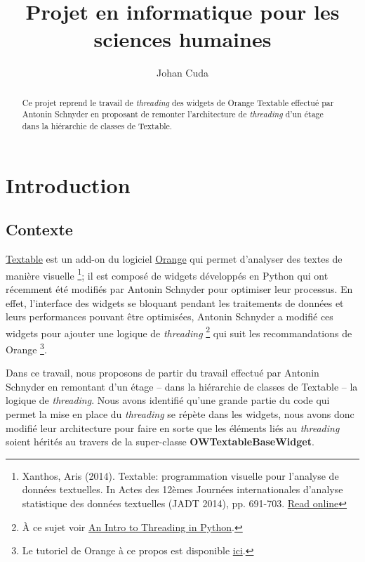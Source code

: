 \documentclass{article}
\title{Projet en informatique pour les sciences humaines}
\author{Johan Cuda}
\begin{document}
\maketitle

\begin{abstract}
Ce projet reprend le travail de \textit{threading} des widgets de Orange Textable effectué par Antonin Schnyder en proposant de remonter l'architecture de \textit{threading} d'un étage dans la hiérarchie de classes de Textable. 
\end{abstract}

\tableofcontents

\section{Introduction}

\subsection{Contexte}

\href{http://textable.io/}{Textable} est un add-on du logiciel \href{https://orangedatamining.com/}{Orange} qui permet d'analyser des textes de manière visuelle \footnote{Xanthos, Aris (2014). Textable: programmation visuelle pour l’analyse de données textuelles. In Actes des 12èmes Journées internationales d’analyse statistique des données textuelles (JADT 2014), pp. 691-703. \href{http://lexicometrica.univ-paris3.fr/jadt/jadt2014/01-ACTES/57-JADT2014.pdf}{Read online}}; il est composé de widgets développés en Python qui ont récemment été modifiés par Antonin Schnyder pour optimiser leur processus. En effet, l'interface des widgets se bloquant pendant les traitements de données et leurs performances pouvant être optimisées, Antonin Schnyder a modifié ces widgets pour ajouter une logique de \textit{threading} \footnote{À ce sujet voir \href{https://realpython.com/intro-to-python-threading/}{An Intro to Threading in Python}.} qui suit les recommandations de Orange \footnote{Le tutoriel de Orange à ce propos est disponible \href{https://orange3.readthedocs.io/projects/orange-development/en/latest/tutorial-responsive-gui.html}{ici}.}.\newline

Dans ce travail, nous proposons de partir du travail effectué par Antonin Schnyder en remontant d'un étage – dans la hiérarchie de classes de Textable – la logique de \textit{threading}. Nous avons identifié qu'une grande partie du code qui permet la mise en place du \textit{threading} se répète dans les widgets, nous avons donc modifié  leur architecture pour faire en sorte que les éléments liés au \textit{threading} soient hérités au travers de la super-classe \textbf{OWTextableBaseWidget}.
\newline
\end{document}
